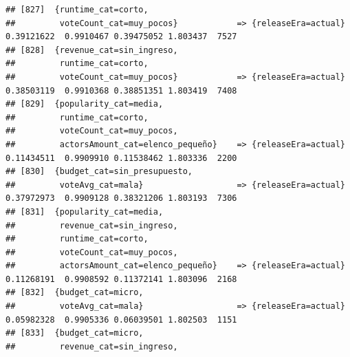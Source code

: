 \documentclass[
]{article}
\begin{document}
\begin{verbatim}
## [827]  {runtime_cat=corto,                                                                                                      
##         voteCount_cat=muy_pocos}            => {releaseEra=actual}               0.39121622  0.9910467 0.39475052 1.803437  7527
## [828]  {revenue_cat=sin_ingreso,                                                                                                
##         runtime_cat=corto,                                                                                                      
##         voteCount_cat=muy_pocos}            => {releaseEra=actual}               0.38503119  0.9910368 0.38851351 1.803419  7408
## [829]  {popularity_cat=media,                                                                                                   
##         runtime_cat=corto,                                                                                                      
##         voteCount_cat=muy_pocos,                                                                                                
##         actorsAmount_cat=elenco_pequeño}    => {releaseEra=actual}               0.11434511  0.9909910 0.11538462 1.803336  2200
## [830]  {budget_cat=sin_presupuesto,                                                                                             
##         voteAvg_cat=mala}                   => {releaseEra=actual}               0.37972973  0.9909128 0.38321206 1.803193  7306
## [831]  {popularity_cat=media,                                                                                                   
##         revenue_cat=sin_ingreso,                                                                                                
##         runtime_cat=corto,                                                                                                      
##         voteCount_cat=muy_pocos,                                                                                                
##         actorsAmount_cat=elenco_pequeño}    => {releaseEra=actual}               0.11268191  0.9908592 0.11372141 1.803096  2168
## [832]  {budget_cat=micro,                                                                                                       
##         voteAvg_cat=mala}                   => {releaseEra=actual}               0.05982328  0.9905336 0.06039501 1.802503  1151
## [833]  {budget_cat=micro,                                                                                                       
##         revenue_cat=sin_ingreso,                                                                                                

\end{verbatim}
\end{document}
